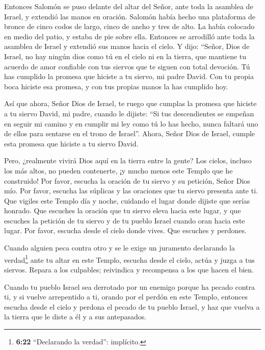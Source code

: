  Entonces Salomón se puso delante del altar del Señor, ante
toda la asamblea de Israel, y extendió las manos en oración.
 Salomón había hecho una plataforma de bronce de cinco
codos de largo, cinco de ancho y tres de alto. La había colocado en
medio del patio, y estaba de pie sobre ella. Entonces se arrodilló ante
toda la asamblea de Israel y extendió sus manos hacia el cielo.
 Y dijo: ``Señor, Dios de Israel, no hay ningún dios como
tú en el cielo ni en la tierra, que mantiene tu acuerdo de amor
confiable con tus siervos que te siguen con total devoción.
 Tú has cumplido la promesa que hiciste a tu siervo, mi
padre David. Con tu propia boca hiciste esa promesa, y con tus propias
manos la has cumplido hoy.

 Así que ahora, Señor Dios de Israel, te ruego que cumplas
la promesa que hiciste a tu siervo David, mi padre, cuando le dijiste:
``Si tus descendientes se empeñan en seguir mi camino y en cumplir mi
ley como tú lo has hecho, nunca faltará uno de ellos para sentarse en el
trono de Israel''.  Ahora, Señor Dios de Israel, cumple
esta promesa que hiciste a tu siervo David.

 Pero, ¿realmente vivirá Dios aquí en la tierra entre la
gente? Los cielos, incluso los más altos, no pueden contenerte, ¡y mucho
menos este Templo que he construido!  Por favor, escucha la
oración de tu siervo y su petición, Señor Dios mío. Por favor, escucha
las súplicas y las oraciones que tu siervo presenta ante ti.
 Que vigiles este Templo día y noche, cuidando el lugar
donde dijiste que serías honrado. Que escuches la oración que tu siervo
eleva hacia este lugar,  y que escuches la petición de tu
siervo y de tu pueblo Israel cuando oran hacia este lugar. Por favor,
escucha desde el cielo donde vives. Que escuches y perdones.

 Cuando alguien peca contra otro y se le exige un juramento
declarando la verdad\footnote{\textbf{6:22} ``Declarando la verdad'':
  implícito.} ante tu altar en este Templo,  escucha desde
el cielo, actúa y juzga a tus siervos. Repara a los culpables;
reivindica y recompensa a los que hacen el bien.

 Cuando tu pueblo Israel sea derrotado por un enemigo
porque ha pecado contra ti, y si vuelve arrepentido a ti, orando por el
perdón en este Templo,  entonces escucha desde el cielo y
perdona el pecado de tu pueblo Israel, y haz que vuelva a la tierra que
le diste a él y a sus antepasados.

